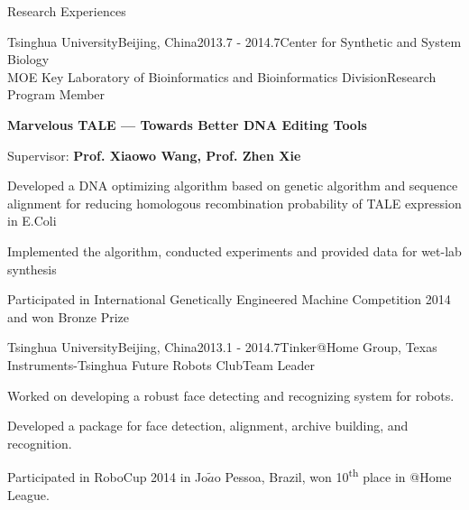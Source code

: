 \documentclass{resume} %
\begin{document}
\begin{rSection}{Research Experiences}
\begin{rSubsection}{Tsinghua University}{Beijing, China}{2013.7 - 2014.7}{Center for Synthetic and System Biology\\ MOE Key Laboratory of Bioinformatics and Bioinformatics Division}{Research Program Member}
    \item {\bf Marvelous TALE --- Towards Better DNA Editing Tools}
	\item Supervisor: {\bf Prof. Xiaowo Wang, Prof. Zhen Xie}
	\item Developed a DNA optimizing algorithm based on genetic algorithm and sequence alignment for reducing homologous recombination probability of TALE expression in E.Coli
	\item Implemented the algorithm, conducted experiments and provided data for wet-lab synthesis
	\item Participated in International Genetically Engineered Machine Competition 2014 and won Bronze Prize
\end{rSubsection}


\begin{rSubsection}{Tsinghua University}{Beijing, China}{2013.1 - 2014.7}{Tinker@Home Group, Texas Instruments-Tsinghua Future Robots Club}{Team Leader}

\item Worked on developing a robust face detecting and recognizing system for robots.
\item Developed a package for face detection, alignment, archive building, and recognition.
\item Participated in RoboCup 2014 in Jo$\tilde{a}$o Pessoa, Brazil, won 10\textsuperscript{th} place in @Home League.	
\end{rSubsection}






\end{rSection}
\end{document}
